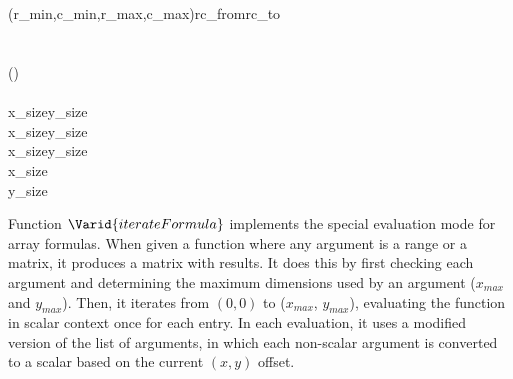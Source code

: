 \begin{hscode}
\\
\>[10]{}\<[13]%
\>[13]{}\<[E]%
\\
\>[13]{}\<[16]%
\>[16]{}(r_{min},c_{min},r_{max},c_{max})\mathrel{=}\;\;rc_{from}\;rc_{to}{}\<[E]%
\\
\>[4]{}\<[7]%
\>[7]{}\to {}\<[E]%
\\
\>[B]{}\<[4]%
\>[4]{}\<[E]%
\\
\>[4]{}\<[7]%
\>[7]{}\mathbin{::}{}\<[23]%
\>[23]{}\to {}\to {}\to {}\to (\to {}\to {}){}\<[E]%
\\
\>[23]{}\to {}\<[E]%
\\
\>[4]{}\<[7]%
\>[7]{}\;\;\;x_{size}\;y_{size}\;\<[E]%
\\
\>[7]{}\<[10]%
\>[10]{}\mid x_{size}\mathbin{>}\<[24]%
\>[24]{}\mathrel{\wedge}{}\<[24E]%
\>[28]{}y_{size}\mathbin{>}\<[40]%
\>[40]{}\mathrel{=}\;\;\<[E]%
\\
\>[7]{}\<[10]%
\>[10]{}\mid x_{size}\equiv {}\<[24]%
\>[24]{}\mathrel{\wedge}{}\<[24E]%
\>[28]{}y_{size}\equiv {}\<[40]%
\>[40]{}\mathrel{=}\;\;\<[E]%
\\
\>[7]{}\<[10]%
\>[10]{}\mid x_{size}\equiv {}\<[24]%
\>[24]{}\mathrel{\wedge}{}\<[24E]%
\>[28]{}\mathbin{>}\<[40]%
\>[40]{}\mathrel{=}\;\;\<[E]%
\\
\>[7]{}\<[10]%
\>[10]{}\mid y_{size}\equiv {}\<[24]%
\>[24]{}\mathrel{\wedge}{}\<[24E]%
\>[28]{}\mathbin{>}\<[40]%
\>[40]{}\mathrel{=}\;\;\<[E]%
\\
\>[7]{}\<[10]%
\>[10]{}\mid {}\<[40]%
\>[40]{}\mathrel{=}\mathbin{\$}\;\<[E]%
\ColumnHook
\end{hscode}\resethooks

Function \ensuremath{\Varid{iterateFormula}} implements the special evaluation mode for array
formulas. When given a function where any argument is a range or a matrix, it
produces a matrix with results. It does this by first checking each argument
and determining the maximum dimensions used by an argument (\ensuremath{x_{max}} and
\ensuremath{y_{max}}). Then, it iterates from $(0, 0)$ to (\ensuremath{x_{max}}, \ensuremath{y_{max}}), evaluating the
function in scalar context once for each entry. In each evaluation, it uses a
modified version of the list of arguments, in which each non-scalar argument
is converted to a scalar based on the current $(x, y)$ offset.

